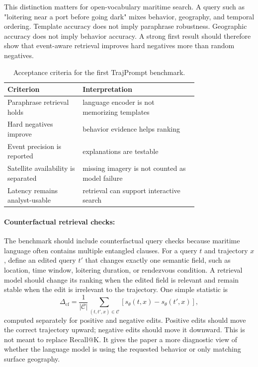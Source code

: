 \documentclass{article}
\begin{document}
This distinction matters for open-vocabulary maritime search. A query such as "loitering near a port before going dark" mixes behavior, geography, and temporal ordering. Template accuracy does not imply paraphrase robustness. Geographic accuracy does not imply behavior accuracy. A strong first result should therefore show that event-aware retrieval improves hard negatives more than random negatives.

\begin{table}[t]
\centering
\caption{Acceptance criteria for the first TrajPrompt benchmark.}
\begin{tabular}{@{}p{0.30\linewidth}p{0.46\linewidth}@{}}
\toprule
\textbf{Criterion} & \textbf{Interpretation}\\
\midrule
Paraphrase retrieval holds & language encoder is not memorizing templates\\
Hard negatives improve & behavior evidence helps ranking\\
Event precision is reported & explanations are testable\\
Satellite availability is separated & missing imagery is not counted as model failure\\
Latency remains analyst-usable & retrieval can support interactive search\\
\bottomrule
\end{tabular}
\end{table}

\paragraph{Counterfactual retrieval checks:}

The benchmark should include counterfactual query checks because maritime language often contains multiple entangled clauses. For a query $t$ and trajectory $x$, define an edited query $t'$ that changes exactly one semantic field, such as location, time window, loitering duration, or rendezvous condition. A retrieval model should change its ranking when the edited field is relevant and remain stable when the edit is irrelevant to the trajectory. One simple statistic is
\begin{equation}
  \Delta_{\mathrm{cf}} =
  \frac{1}{|\mathcal{C}|}
  \sum_{(t,t',x)\in\mathcal{C}}
  \left[
    s_\theta(t,x)-s_\theta(t',x)
  \right],
\end{equation}
computed separately for positive and negative edits. Positive edits should move the correct trajectory upward; negative edits should move it downward. This is not meant to replace Recall@K. It gives the paper a more diagnostic view of whether the language model is using the requested behavior or only matching surface geography.
\end{document}
